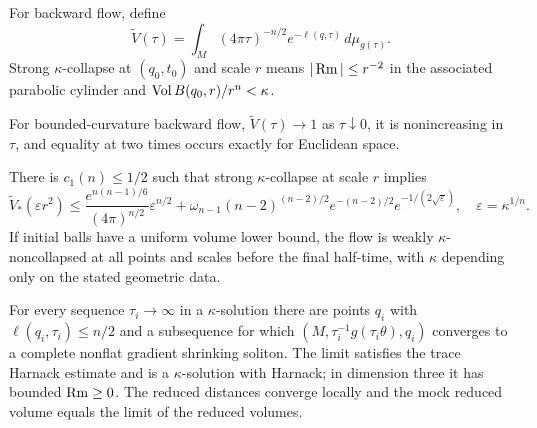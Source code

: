 \begin{definition}
\label{def:chow-iii-reduced-volume-strong-collapse}

For backward flow, define
\[
\widetilde V(\tau)=\int_M(4\pi\tau)^{-n/2}e^{-\ell(q,\tau)}\,d\mu_{g(\tau)}.
\]
Strong $\kappa$-collapse at $(q_0,t_0)$ and scale $r$ means
$|\operatorname{Rm}|\le r^{-2}$ in the associated parabolic cylinder and
$\operatorname{Vol} B(q_0,r)/r^n<\kappa$.
\end{definition}

\begin{theorem}
\label{thm:chow-iii-reduced-volume-monotonicity}


For bounded-curvature backward flow, $\widetilde V(\tau)\to1$ as $\tau\downarrow0$,
it is nonincreasing in $\tau$, and equality at two times occurs exactly for
Euclidean space.
\end{theorem}

\begin{theorem}
\label{thm:chow-iii-weakened-no-local-collapsing}


There is $c_1(n)\le1/2$ such that strong $\kappa$-collapse at scale $r$ implies
\[
\widetilde V_*(\varepsilon r^2)\le
\frac{e^{n(n-1)/6}}{(4\pi)^{n/2}}\varepsilon^{n/2}
 +\omega_{n-1}(n-2)^{(n-2)/2}e^{-(n-2)/2}e^{-1/(2\sqrt\varepsilon)},
\quad \varepsilon=\kappa^{1/n}.
\]
If initial balls have a uniform volume lower bound, the flow is weakly
$\kappa$-noncollapsed at all points and scales before the final half-time,
with $\kappa$ depending only on the stated geometric data.
\end{theorem}

\begin{theorem}
\label{thm:chow-iii-asymptotic-shrinker}


For every sequence $\tau_i\to\infty$ in a $\kappa$-solution there are points
$q_i$ with $\ell(q_i,\tau_i)\le n/2$ and a subsequence for which
$(M,\tau_i^{-1}g(\tau_i\theta),q_i)$ converges to a complete nonflat gradient
shrinking soliton.  The limit satisfies the trace Harnack estimate and is a
$\kappa$-solution with Harnack; in dimension three it has bounded
$\operatorname{Rm}\ge0$.  The reduced distances converge locally and the mock reduced volume
equals the limit of the reduced volumes.
\end{theorem}


